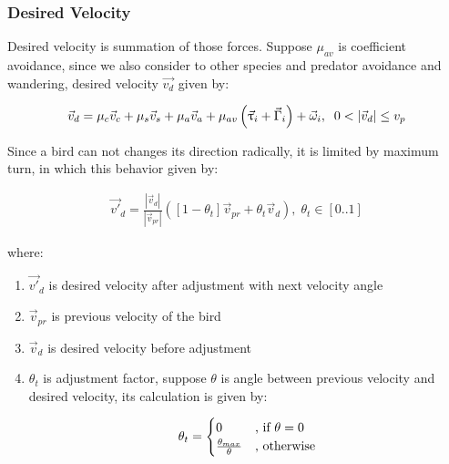 \documentclass[journal,transmag]{IEEEtran}
\begin{document}
\subsubsection{Desired Velocity}

Desired velocity is summation of those forces. Suppose \(\mu_{av}\) is coefficient avoidance, since we also consider to other species and predator avoidance and wandering, desired velocity \(\vec{v_d}\) given by:

\[
\vec{v}_d = \mu_c \vec{v}_c + \mu_s\vec{v}_s + \mu_a\vec{v}_a + \mu_{av} \left( \vec{\uptau}_i + \vec{\Gamma}_i \right) + \vec{\omega}_i, \;\;0 < |\vec{v}_d| \leq v_p\\
\]

Since a bird can not changes its direction radically, it is limited by maximum turn, in which this behavior given by:

\begin{align}
\vec{v'}_d = \frac{|\vec{v}_d|}{|\vec{v}_{pr}|}\left( \left[1 - \theta_t\right]\vec{v}_{pr} + \theta_t\vec{v}_d\right), \;\theta_t \in \left[0..1\right]
\end{align}

where:

\begin{enumerate}
\item \(\vec{v'}_d\) is desired velocity after adjustment with next velocity angle
\item \(\vec{v}_{pr}\) is previous velocity of the bird
\item \(\vec{v}_d\) is desired velocity before adjustment
\item \(\theta_t\) is adjustment factor, suppose \(\theta\) is angle between previous velocity and desired velocity, its calculation is given by:

\begin{equation*}
\theta_t = \begin{cases}
0 &\text{, if $ \theta = 0$}\\
\frac{\theta_{max}}{\theta}&\text{, otherwise}
\end{cases}
\end{equation*}
\end{enumerate}
\end{document}
